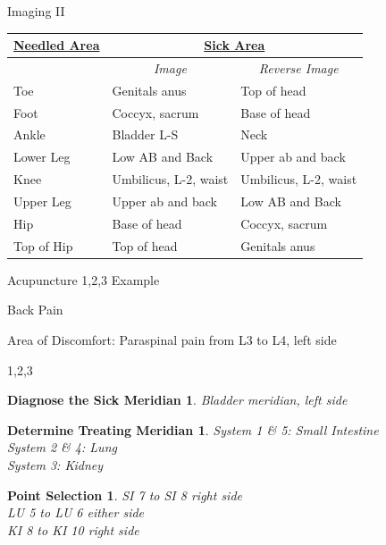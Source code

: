 \documentclass{beamer}
\begin{document}
\begin{frame}{Imaging II}
  \begin{table}[]
    \begin{tabular}{l|ll}
      {\ul \textbf{Needled Area}} & \multicolumn{2}{c}{{\ul \textbf{Sick Area}}}                                    \\ \hline
      & \multicolumn{1}{c}{\textit{Image}} & \multicolumn{1}{c}{\textit{Reverse Image}} \\
      Toe                         & Genitals anus                      & Top of head                                \\
      Foot                        & Coccyx, sacrum                     & Base of head                               \\
      Ankle                       & Bladder L-S                        & Neck                                       \\
      Lower Leg                   & Low AB and Back                    & Upper ab and back                          \\
      Knee                        & Umbilicus, L-2, waist              & Umbilicus, L-2, waist                      \\
      Upper Leg                   & Upper ab and back                  & Low AB and Back                            \\
      Hip                         & Base of head                       & Coccyx, sacrum                             \\
      Top of Hip                  & Top of head                        & Genitals anus                             
    \end{tabular}
  \end{table}
\end{frame}

\begin{frame}{Acupuncture 1,2,3 Example}
  \newtheorem{s1}{Diagnose the Sick Meridian}
  \newtheorem{s2}{Determine Treating Meridian}
  \newtheorem{s3}{Point Selection}
  \LARGE{Back Pain}

  Area of Discomfort: Paraspinal pain from L3 to L4, left side
\end{frame}
\begin{frame}{1,2,3}
  \begin{s1}
    Bladder meridian, left side
  \end{s1}

  \begin{s2}
    System 1 \& 5: Small Intestine\\
    System 2 \& 4: Lung\\
    System 3: Kidney
  \end{s2}

  \begin{s3}
    SI 7 to SI 8 right side \\
    LU 5 to LU 6 either side \\
    KI 8 to KI 10 right side \\
  \end{s3}
\end{frame}
\end{document}

